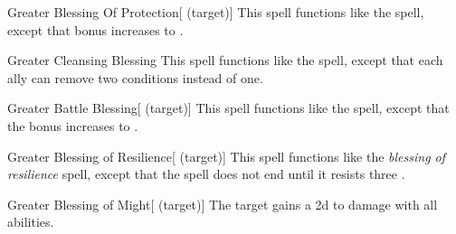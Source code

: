 \lowercase{\hypertarget{spell:Greater Blessing Of Protection}{}}\label{spell:Greater Blessing Of Protection}
\begin{attuneability}[\nth{4}]{\hypertarget{spell:Greater Blessing Of Protection}{Greater Blessing Of Protection}}[ (target)]
This spell functions like the  spell, except that bonus increases to .
\end{attuneability}
\vspace{0.25em}



\lowercase{\hypertarget{spell:Greater Cleansing Blessing}{}}\label{spell:Greater Cleansing Blessing}
\begin{apability}[\nth{4}]{\hypertarget{spell:Greater Cleansing Blessing}{Greater Cleansing Blessing}}
This spell functions like the  spell, except that each ally can remove two conditions instead of one.
\end{apability}
\vspace{0.25em}



\lowercase{\hypertarget{spell:Greater Battle Blessing}{}}\label{spell:Greater Battle Blessing}
\begin{attuneability}[\nth{5}]{\hypertarget{spell:Greater Battle Blessing}{Greater Battle Blessing}}[ (target)]
This spell functions like the  spell, except that the bonus increases to .
\end{attuneability}
\vspace{0.25em}



\lowercase{\hypertarget{spell:Greater Blessing of Resilience}{}}\label{spell:Greater Blessing of Resilience}
\begin{attuneability}[\nth{5}]{\hypertarget{spell:Greater Blessing of Resilience}{Greater Blessing of Resilience}}[ (target)]
This spell functions like the \textit{blessing of resilience} spell, except that the spell does not end until it resists three .
\end{attuneability}
\vspace{0.25em}



\lowercase{\hypertarget{spell:Greater Blessing of Might}{}}\label{spell:Greater Blessing of Might}
\begin{attuneability}[\nth{6}]{\hypertarget{spell:Greater Blessing of Might}{Greater Blessing of Might}}[ (target)]
The target gains a \plus2d  to damage with all abilities.
\end{attuneability}
\vspace{0.25em}



